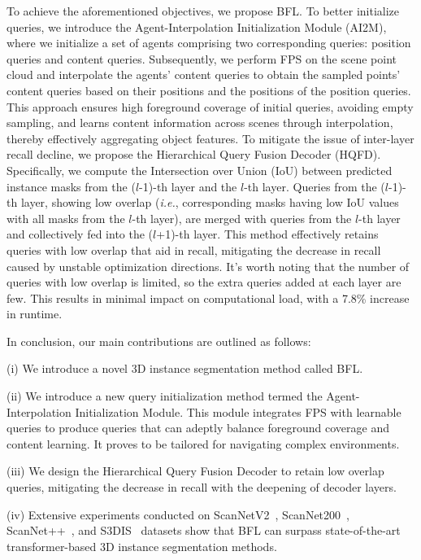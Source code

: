 %

To achieve the aforementioned objectives, we propose BFL.
%
To better initialize queries, we introduce the Agent-Interpolation Initialization Module (AI2M), where we initialize a set of agents comprising two corresponding queries: position queries and content queries. Subsequently, we perform FPS on the scene point cloud and interpolate the agents' content queries to obtain the sampled points' content queries based on their positions and the positions of the position queries. This approach ensures high foreground coverage of initial queries, avoiding empty sampling, and learns content information across scenes through interpolation, thereby effectively aggregating object features.
%
To mitigate the issue of inter-layer recall decline, we propose the Hierarchical Query Fusion Decoder (HQFD). 
%
Specifically, we compute the Intersection over Union (IoU) between predicted instance masks from the ($l$-1)-th layer and the $l$-th layer. 
%
Queries from the ($l$-1)-th layer, showing low overlap (\textit{i.e.}, corresponding masks having low IoU values with all masks from the $l$-th layer), are merged with queries from the $l$-th layer and collectively fed into the ($l$+1)-th layer. This method effectively retains queries with low overlap that aid in recall, mitigating the decrease in recall caused by unstable optimization directions. It's worth noting that the number of queries with low overlap is limited, so the extra queries added at each layer are few. This results in minimal impact on computational load, with a 7.8\% increase in runtime.

%
In conclusion, our main contributions are outlined as follows:

(i) We introduce a novel 3D instance segmentation method called BFL.

(ii) We introduce a new query initialization method termed the Agent-Interpolation Initialization Module. This module integrates FPS with learnable queries to produce queries that can adeptly balance foreground coverage and content learning. It proves to be tailored for navigating complex environments.

(iii) We design the Hierarchical Query Fusion Decoder to retain low overlap queries, mitigating the decrease in recall with the deepening of decoder layers.

(iv) Extensive experiments conducted on ScanNetV2~\cite{dai2017scannet}, ScanNet200~\cite{rozenberszki2022language}, ScanNet++~\cite{yeshwanth2023scannet++}, and S3DIS~\cite{armeni20163d} datasets show that BFL can surpass state-of-the-art transformer-based 3D instance segmentation methods.
